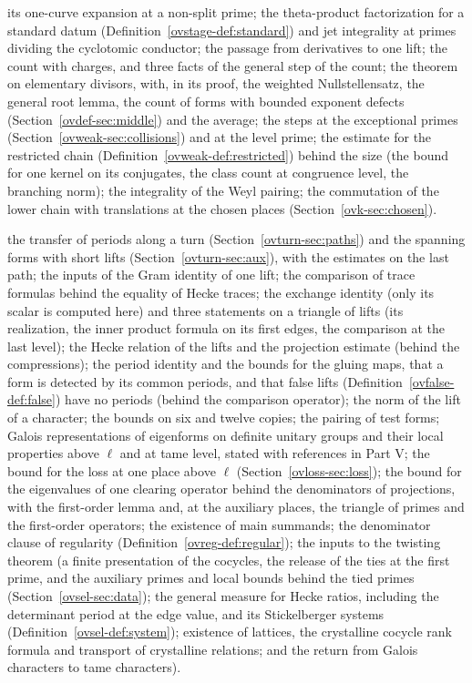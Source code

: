 \documentclass[reqno]{amsart}
\theoremstyle{definition}
\begin{document}
\begin{description}
  its one-curve expansion at a non-split prime; the theta-product
  factorization for a standard datum (Definition~\ref{ovstage-def:standard})
  and jet integrality at primes dividing
  the cyclotomic conductor; the passage from derivatives to one lift; the
  count with charges, and three facts of the general step of the count; the
  theorem on elementary divisors, with, in its proof, the weighted
  Nullstellensatz, the general root lemma, the count of forms with bounded
  exponent defects (Section~\ref{ovdef-sec:middle}) and the average; the steps at the
  exceptional primes (Section~\ref{ovweak-sec:collisions}) and at the
  level prime; the estimate for the restricted chain
  (Definition~\ref{ovweak-def:restricted}) behind the size (the
  bound for one kernel on its conjugates, the class count at congruence
  level, the branching norm); the integrality of the Weyl pairing; the
  commutation of the lower chain with translations at the chosen places (Section~\ref{ovk-sec:chosen}).
\item[Part IX] the transfer of periods along a turn (Section~\ref{ovturn-sec:paths})
  and the spanning forms with short lifts (Section~\ref{ovturn-sec:aux}),
  with the estimates on the last path; the inputs of the Gram identity of one lift; the
  comparison of trace formulas behind the equality of Hecke traces; the
  exchange identity (only its scalar is computed here) and three statements
  on a triangle of lifts (its realization, the inner product formula on its
  first edges, the comparison at the last level); the Hecke relation of the
  lifts and the projection estimate (behind the compressions); the period
  identity and the bounds for the gluing maps, that a form is detected by
  its common periods, and that false lifts (Definition~\ref{ovfalse-def:false}) have no periods (behind the
  comparison operator); the norm of the lift of a character; the bounds on
  six and twelve copies; the pairing of test forms; Galois representations
  of eigenforms on definite unitary groups and their local properties above
  \(\ell\) and at tame level, stated with references in Part V; the bound
  for the loss at one place above \(\ell\) (Section~\ref{ovloss-sec:loss}); the bound for the eigenvalues of
  one clearing operator behind the denominators of projections, with the
  first-order lemma and, at the auxiliary places, the triangle of primes and
  the first-order operators; the existence of main summands; the denominator
  clause of regularity (Definition~\ref{ovreg-def:regular}); the inputs to the twisting theorem (a finite
  presentation of the cocycles, the release of the ties at the first prime,
  and the auxiliary primes and local bounds behind the tied primes (Section~\ref{ovsel-sec:data}); the
  general measure for Hecke ratios, including the determinant period at the
  edge value, and its Stickelberger systems (Definition~\ref{ovsel-def:system}); existence of lattices, the
  crystalline cocycle rank formula and transport of crystalline relations;
  and the return from Galois characters to tame characters).
\end{description}
\end{document}
